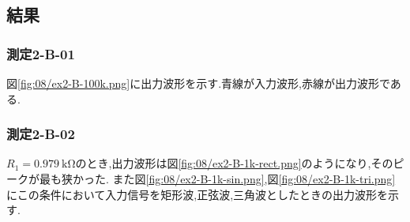\subsection{結果}
\subsubsection{測定2-B-01}
図\ref{fig:08/ex2-B-100k.png}に出力波形を示す.青線が入力波形,赤線が出力波形である.
\subsubsection{測定2-B-02}
$R_1=0.979\ \si{\kilo\ohm}$のとき,出力波形は図\ref{fig:08/ex2-B-1k-rect.png}のようになり,そのピークが最も狭かった.
また図\ref{fig:08/ex2-B-1k-sin.png},図\ref{fig:08/ex2-B-1k-tri.png}にこの条件において入力信号を矩形波,正弦波,三角波としたときの出力波形を示す.
